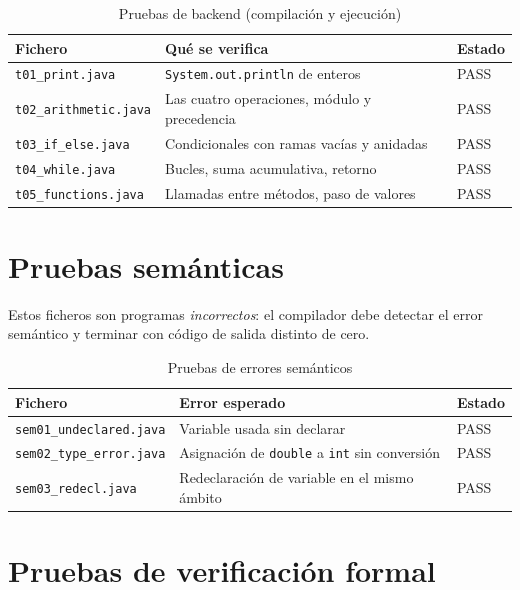 \begin{table}[H]
  \centering
  \caption{Pruebas de backend (compilación y ejecución)}
  \label{tab:backend}
  \begin{tabular}{lp{6cm}l}
    \toprule
    \textbf{Fichero}               & \textbf{Qué se verifica}                  & \textbf{Estado} \\
    \midrule
    \texttt{t01\_print.java}       & \texttt{System.out.println} de enteros     & PASS \\
    \texttt{t02\_arithmetic.java}  & Las cuatro operaciones, módulo y precedencia & PASS \\
    \texttt{t03\_if\_else.java}    & Condicionales con ramas vacías y anidadas  & PASS \\
    \texttt{t04\_while.java}       & Bucles, suma acumulativa, retorno          & PASS \\
    \texttt{t05\_functions.java}   & Llamadas entre métodos, paso de valores    & PASS \\
    \bottomrule
  \end{tabular}
\end{table}

\section{Pruebas semánticas}

Estos ficheros son programas \emph{incorrectos}: el compilador debe
detectar el error semántico y terminar con código de salida distinto
de cero.

\begin{table}[H]
  \centering
  \caption{Pruebas de errores semánticos}
  \label{tab:semantic}
  \begin{tabular}{lp{6.5cm}l}
    \toprule
    \textbf{Fichero}               & \textbf{Error esperado}                   & \textbf{Estado} \\
    \midrule
    \texttt{sem01\_undeclared.java} & Variable usada sin declarar              & PASS \\
    \texttt{sem02\_type\_error.java}& Asignación de \texttt{double} a \texttt{int} sin conversión & PASS \\
    \texttt{sem03\_redecl.java}     & Redeclaración de variable en el mismo ámbito & PASS \\
    \bottomrule
  \end{tabular}
\end{table}

\section{Pruebas de verificación formal}

